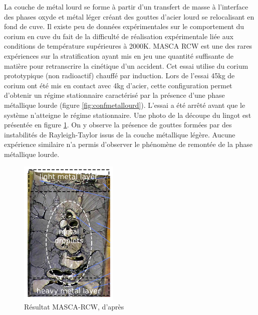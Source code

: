 La couche de métal lourd se forme à partir d'un transfert de masse à l'interface des phases oxyde et métal léger créant des gouttes d'acier lourd se relocalisant en fond de cuve. Il existe peu de données expérimentales sur le comportement du corium en cuve du fait de la difficulté de réalisation expérimentale liée aux conditions de température supérieures à 2000K. MASCA RCW \cite{tsurikov_main_nodate} est une des rares expériences sur la stratification ayant mis en jeu une quantité suffisante de matière pour retranscrire la cinétique d'un accident. Cet essai utilise du corium prototypique (non radioactif) chauffé par induction. Lors de l'essai 45kg de corium ont été mis en contact avec 4kg d'acier, cette configuration permet d'obtenir un régime stationnaire caractérisé par la présence d'une phase métallique lourde (figure \ref{fig:confmetallourd}). L'essai a été arrêté avant que le système n'atteigne le régime stationnaire. Une photo de la découpe du lingot est présentée en figure \ref{fig:masca}. On y observe la présence de gouttes formées par des instabilités de Rayleigh-Taylor issus de la couche métallique légère. Aucune expérience similaire n'a permis d'observer le phénomène de remontée de la phase métallique lourde.

 \begin{figure}[H]
	\centering
	\includegraphics[width=0.3\linewidth]{figure/MASCA_RCW.png}
	\caption[Résultat MASCA-RCW 100]{Résultat MASCA-RCW, d'après \cite{tellier_interfaces_2019}}
	\label{fig:masca}
\end{figure}


